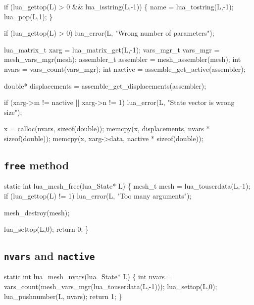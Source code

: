 if (lua_gettop(L) > 0 && lua_isstring(L,-1)) \{
    name = lua_tostring(L,-1);
    lua_pop(L,1);
\}

if (lua_gettop(L) > 0)
    lua_error(L, "Wrong number of parameters");

\nwendcode{}\nwdocspar

\nwenddocs{}\endmoddef
lua_matrix_t xarg = lua_matrix_get(L,-1);
vars_mgr_t   vars_mgr  = mesh_vars_mgr(mesh);
assembler_t  assembler = mesh_assembler(mesh);
int          nvars     = vars_count(vars_mgr);
int          nactive   = assemble_get_active(assembler);

double*      displacements = assemble_get_displacements(assembler);

if (xarg->m != nactive || xarg->n != 1)
    lua_error(L, "State vector is wrong size");

x = calloc(nvars, sizeof(double));
memcpy(x, displacements, nvars * sizeof(double));
memcpy(x, xarg->data, nactive * sizeof(double));
 
\nwendcode{}\nwdocspar

\subsection{{\tt{}free} method}

\nwenddocs{}\plusendmoddef
static int lua_mesh_free(lua_State* L)
\{
    mesh_t mesh = lua_touserdata(L,-1);
    if (lua_gettop(L) != 1)
        lua_error(L, "Too many arguments");

    mesh_destroy(mesh);

    lua_settop(L,0);
    return 0;
\}

\nwendcode{}\nwdocspar


\subsection{{\tt{}nvars} and {\tt{}nactive}}

\nwenddocs{}\plusendmoddef
static int lua_mesh_nvars(lua_State* L)
\{
    int nvars = vars_count(mesh_vars_mgr(lua_touserdata(L,-1)));
    lua_settop(L,0);
    lua_pushnumber(L, nvars);
    return 1;
\}

